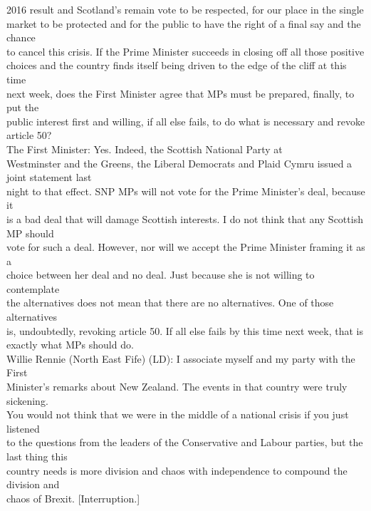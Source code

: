 \documentclass{article}
\begin{document}
\begin{description}
{2016 result and Scotland’s remain vote to be respected, for our place in the single\\
market to be protected and for the public to have the right of a final say and the chance\\
to cancel this crisis. If the Prime Minister succeeds in closing off all those positive\\
choices and the country finds itself being driven to the edge of the cliff at this time\\
next week, does the First Minister agree that MPs must be prepared, finally, to put the\\
public interest first and willing, if all else fails, to do what is necessary and revoke\\
article 50?\\
The First Minister: Yes. Indeed, the Scottish National Party at\\
Westminster and the Greens, the Liberal Democrats and Plaid Cymru issued a joint statement last\\
night to that effect. SNP MPs will not vote for the Prime Minister’s deal, because it\\
is a bad deal that will damage Scottish interests. I do not think that any Scottish MP should\\
vote for such a deal. However, nor will we accept the Prime Minister framing it as a\\
choice between her deal and no deal. Just because she is not willing to contemplate\\
the alternatives does not mean that there are no alternatives. One of those alternatives\\
is, undoubtedly, revoking article 50. If all else fails by this time next week, that is\\
exactly what MPs should do.\\
Willie Rennie (North East Fife) (LD): I associate myself and my party with the First\\
Minister’s remarks about New Zealand. The events in that country were truly sickening.\\
You would not think that we were in the middle of a national crisis if you just listened\\
to the questions from the leaders of the Conservative and Labour parties, but the last thing this\\
country needs is more division and chaos with independence to compound the division and\\
chaos of Brexit. [Interruption.]\\
}
\end{description}
\end{document}
